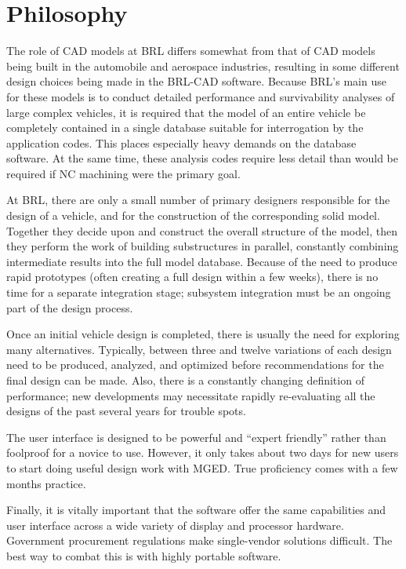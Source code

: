 \section{Philosophy}

The role of CAD models at BRL differs somewhat from
that of CAD models being built in the automobile and aerospace industries,
resulting in some different design choices
being made in the BRL-CAD software.
Because BRL's main use for these models is to conduct detailed
performance and survivability analyses of large complex vehicles,
it is required that the model of an entire vehicle be completely contained
in a single database suitable for interrogation by the application codes.
This places especially heavy demands on the database software.
At the same time, these analysis codes require less detail
than would be required if NC machining were the primary goal.

At BRL, there are only a small number of primary designers responsible
for the design of a vehicle, and for the construction of the corresponding
solid model.  Together they decide upon and construct the
overall structure of the model,
then they perform the work of building substructures in parallel,
constantly combining intermediate results into the full model database.
Because of the need to produce rapid prototypes (often creating a full design
within a few weeks), there is no time for a separate integration stage;
subsystem integration must be an ongoing part of the design process.

Once an initial vehicle design is completed, there is usually the
need for exploring many alternatives.  Typically, between three and twelve
variations of each design need to be produced, analyzed, and optimized
before recommendations for the final design can be made.
Also, there is a constantly changing definition of performance;
new developments may necessitate rapidly re-evaluating
all the designs of the past several years for trouble spots.

The user interface is designed to be powerful and ``expert friendly'' rather
than foolproof for a novice to use.
However, it only takes about two days for new users to start doing useful
design work with MGED.
True proficiency comes with a few months practice.

Finally, it is vitally important that the software offer the same capabilities
and user interface across a wide variety of display and processor hardware.
Government procurement regulations make single-vendor solutions difficult.
The best way to combat this is with highly portable software.

